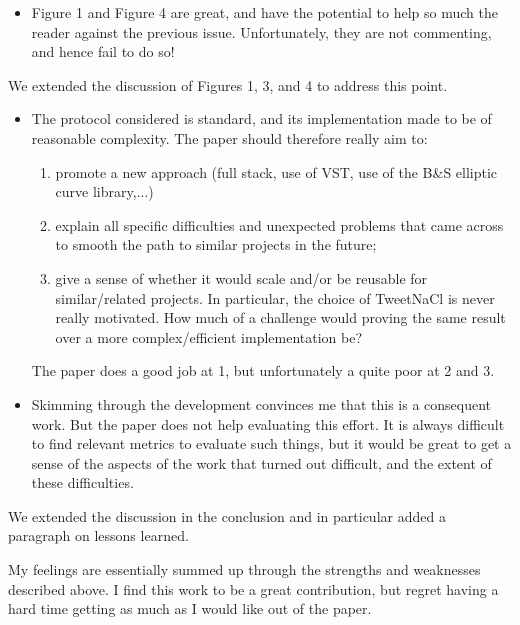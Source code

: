 \begin{itemize}
  \item Figure 1 and Figure 4 are great, and have the potential to help so much the reader against the previous issue. Unfortunately, they are not commenting, and hence fail to do so!
\end{itemize}
\begin{answer}
  We extended the discussion of Figures 1, 3, and 4 to address this point.
\end{answer}
\begin{itemize}
  \item The protocol considered is standard, and its implementation made to be of reasonable complexity. The paper should therefore really aim to:
        \begin{enumerate}
          \item promote a new approach (full stack, use of VST, use of the B\&S elliptic curve library,...)
          \item explain all specific difficulties and unexpected problems that came across to smooth the path to similar projects in the future;
          \item give a sense of whether it would scale and/or be reusable for similar/related projects. In particular, the choice of TweetNaCl is never really motivated. How much of a challenge would proving the same result over a more complex/efficient implementation be?
        \end{enumerate}

        The paper does a good job at 1, but unfortunately a quite poor at 2 and 3.
  \item Skimming through the development convinces me that this is a consequent work. But the paper does not help evaluating this effort. It is always difficult to find relevant metrics to evaluate such things, but it would be great to get a sense of the aspects of the work that turned out difficult, and the extent of these difficulties.
\end{itemize}
\begin{answer}
  We extended the discussion in the conclusion and in particular added a paragraph on lessons learned.
\end{answer}


\begin{center}
\end{center}
My feelings are essentially summed up through the strengths and weaknesses described above. I find this work to be a great contribution, but regret having a hard time getting as much as I would like out of the paper.

